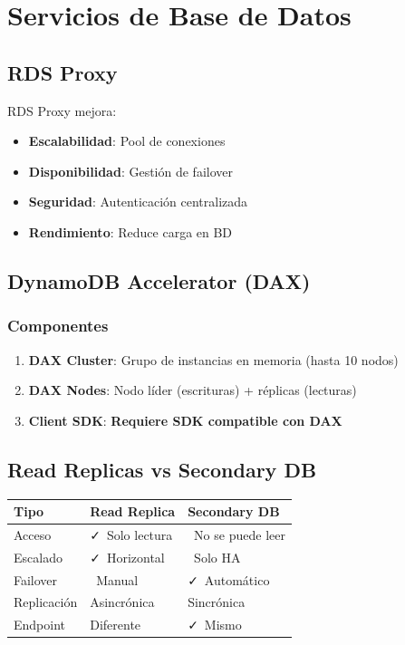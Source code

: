 \documentclass[12pt,a4paper]{report}
\newcommand{\important}[1]{\textcolor{dangerred}{\textbf{#1}}}
\newcommand{\vcheckmark}{\textcolor{successgreen}{\faCheck}}
\newcommand{\crossmark}{\textcolor{dangerred}{\faTimes}}
\newcommand{\warning}{\textcolor{warningyellow}{\faExclamationTriangle}}
\begin{document}
\newpage

\chapter{Servicios de Base de Datos}

\section{RDS Proxy}

\begin{conceptbox}[Propósito]
RDS Proxy mejora:
\begin{itemize}
    \item \textbf{Escalabilidad}: Pool de conexiones
    \item \textbf{Disponibilidad}: Gestión de failover
    \item \textbf{Seguridad}: Autenticación centralizada
    \item \textbf{Rendimiento}: Reduce carga en BD
\end{itemize}
\end{conceptbox}

\section{DynamoDB Accelerator (DAX)}

\subsection{Componentes}

\begin{enumerate}
    \item \textbf{DAX Cluster}: Grupo de instancias en memoria (hasta 10 nodos)
    \item \textbf{DAX Nodes}: Nodo líder (escrituras) + réplicas (lecturas)
    \item \textbf{Client SDK}: \important{Requiere SDK compatible con DAX}
\end{enumerate}

\section{Read Replicas vs Secondary DB}

\begin{center}
\begin{longtable}{|p{3cm}|p{4cm}|p{5cm}|}
\hline
\cellcolor{awsblue!20}\textbf{Tipo} & \cellcolor{awsblue!20}\textbf{Read Replica} & \cellcolor{awsblue!20}\textbf{Secondary DB} \\
\hline
Acceso & \vcheckmark\ Solo lectura & \crossmark\ No se puede leer \\
\hline
Escalado & \vcheckmark\ Horizontal & \crossmark\ Solo HA \\
\hline
Failover & \warning\ Manual & \vcheckmark\ Automático \\
\hline
Replicación & Asincrónica & Sincrónica \\
\hline
Endpoint & Diferente & \vcheckmark\ Mismo \\
\hline
\end{longtable}
\end{center}
\end{document}
